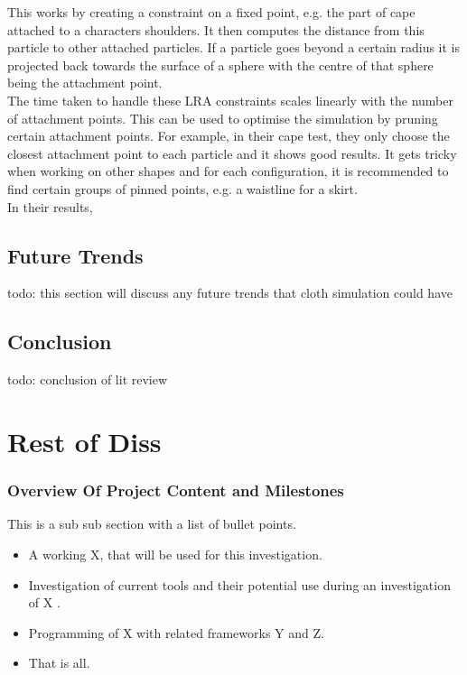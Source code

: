 \documentclass[12pt,a4paper]{article}
\begin{document}
This works by creating a constraint on a fixed point, e.g. the part of cape attached to a characters shoulders. It then computes the distance from this particle to other attached particles. If a particle goes beyond a certain radius it is projected back towards the surface of a sphere with the centre of that sphere being the attachment point.
\\
The time taken to handle these LRA constraints scales linearly with the number of attachment points. This can be used to optimise the simulation by pruning certain attachment points. For example, in their cape test, they only choose the closest attachment point to each particle and it shows good results. It gets tricky when working on other shapes and for each configuration, it is recommended to find certain groups of pinned points, e.g. a waistline for a skirt.
\\
In their results,

\subsection{Future Trends}
todo: this section will discuss any future trends that cloth simulation could have
\subsection{Conclusion}
todo: conclusion of lit review
\newpage



\section{Rest of Diss}

\subsubsection{Overview Of Project Content and Milestones}

This is a sub sub section with a list of bullet points.
\begin{itemize}\itemsep0pt
	\item A working X, that will be used for this investigation.
	\item Investigation of current tools and their potential use during an investigation of X .
	\item Programming of X with related frameworks Y and Z.
	\item That is all.
\end{itemize}
\end{document}
